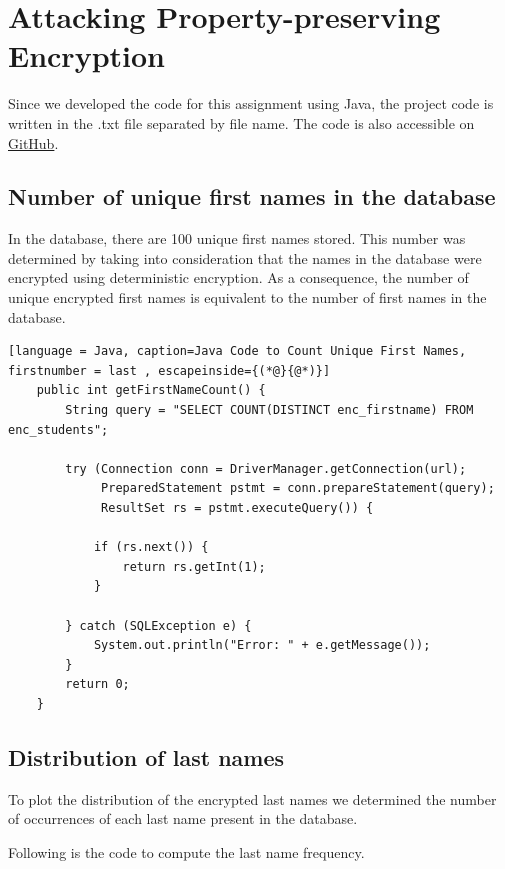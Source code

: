 \section{Attacking Property-preserving Encryption}


Since we developed the code for this assignment using Java, the project code is written in the .txt file separated by file name. The code is also accessible on \href{https://github.com/lallo-unitn/secure_cloud_assignment2/tree/main/cryptoDB/cryptodbProject/src/main/java/nl/ut/eemcs/cloudsec}{GitHub}.

\subsection{Number of unique first names in the database}

In the database, there are 100 unique first names stored. This number was determined by taking into consideration that the names in the database were encrypted using deterministic encryption. As a consequence, the number of unique encrypted first names is equivalent to the number of first names in the database.

\begin{lstlisting}[language = Java, caption=Java Code to Count Unique First Names, firstnumber = last , escapeinside={(*@}{@*)}]
    public int getFirstNameCount() {
        String query = "SELECT COUNT(DISTINCT enc_firstname) FROM enc_students";
    
        try (Connection conn = DriverManager.getConnection(url);
             PreparedStatement pstmt = conn.prepareStatement(query);
             ResultSet rs = pstmt.executeQuery()) {
    
            if (rs.next()) {
                return rs.getInt(1);
            }
    
        } catch (SQLException e) {
            System.out.println("Error: " + e.getMessage());
        }
        return 0;
    }
\end{lstlisting}

\subsection{Distribution of last names}

To plot the distribution of the encrypted last names we determined the number of occurrences of each last name present in the database.

Following is the code to compute the last name frequency.

